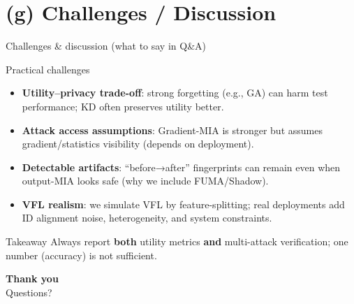 \documentclass[aspectratio=169, 11pt]{beamer}
\begin{document}
\section{(g) Challenges / Discussion}

\begin{frame}{Challenges \& discussion (what to say in Q\&A)}
  \begin{block}{Practical challenges}
    \begin{itemize}
      \item \textbf{Utility–privacy trade-off}: strong forgetting (e.g., GA) can harm test performance; KD often preserves utility better.
      \item \textbf{Attack access assumptions}: Gradient-MIA is stronger but assumes gradient/statistics visibility (depends on deployment).
      \item \textbf{Detectable artifacts}: ``before→after'' fingerprints can remain even when output-MIA looks safe (why we include FUMA/Shadow).
      \item \textbf{VFL realism}: we simulate VFL by feature-splitting; real deployments add ID alignment noise, heterogeneity, and system constraints.
    \end{itemize}
  \end{block}
  \vspace{0.4em}
  \begin{alertblock}{Takeaway}
    Always report \textbf{both} utility metrics \textbf{and} multi-attack verification; one number (accuracy) is not sufficient.
  \end{alertblock}
\end{frame}

\begin{frame}{}
  \centering
  {\Large \textbf{Thank you}}\\[0.9em]
  Questions?
\end{frame}
\end{document}
